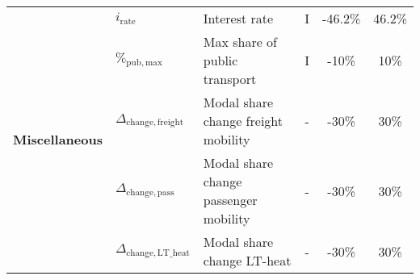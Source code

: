 \begin{table}[htbp!]
\begin{minipage}{\linewidth}
{\begin{tabular}{l l l c c c}
\multirow{6}{*}{\textbf{Miscellaneous}} &$i_{\mathrm{rate}}$  & Interest rate & I & -46.2\% & 46.2\% \\
& $\%_{\mathrm{pub,max}}$ & Max share of public transport & I & -10\% & 10\% \\
& $\Delta_{\mathrm{change,freight}}$ & Modal share change freight mobility & - & -30\% & 30\% \\
& $\Delta_{\mathrm{change,pass}}$ & Modal share change passenger mobility & - & -30\% & 30\% \\
& $\Delta_{\mathrm{change,LT\_heat}}$ & Modal share change LT-heat & - & -30\% & 30\% \\

\bottomrule							

\end{tabular}}
\end{minipage}
\end{table}


